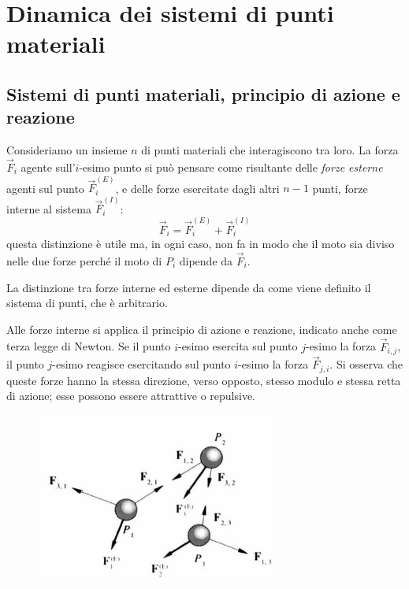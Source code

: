 \documentclass[class=book, crop=false, oneside, 12pt]{standalone}
\begin{document}
\chapter{Dinamica dei sistemi di punti materiali}

\section{Sistemi di punti materiali, principio di azione e reazione}

Consideriamo un insieme \(n\) di punti materiali che interagiscono tra loro.\newline
La forza \(\overrightarrow{F}_i\) agente sull'\(i\)-esimo punto si può pensare come risultante delle \emph{forze esterne}
agenti sul punto \(\overrightarrow{F}_i^{(E)}\), e delle forze esercitate dagli altri \(n-1\) punti, forze interne al sistema \(\overrightarrow{F}_i^{(I)}\):
\begin{equation} \label{forze_interne_esterne}
    \overrightarrow{F}_i = \overrightarrow{F}_i^{(E)} + \overrightarrow{F}_i^{(I)}
\end{equation}
questa distinzione è utile ma, in ogni caso, non fa in modo che il moto sia diviso nelle due forze perché il moto di \(P_i\) dipende da \(\overrightarrow{F}_i\).

La distinzione tra forze interne ed esterne dipende da come viene definito il sistema di punti, che è arbitrario.

Alle forze interne si applica il principio di azione e reazione, indicato anche come terza legge di Newton. 
Se il punto \(i\)-esimo esercita sul punto \(j\)-esimo la forza \(\overrightarrow{F}_{i,j}\), il punto \(j\)-esimo reagisce esercitando sul punto \(i\)-esimo la forza \(\overrightarrow{F}_{j,i}\).
Si osserva che queste forze hanno la stessa direzione, verso opposto, stesso modulo e stessa retta di azione; esse possono essere attrattive o repulsive. 

\begin{figure}[h]
    \includegraphics[scale=0.9]{forze_interne_azione_reazione}
    \centering
    \caption{}
\end{figure}
\end{document}
